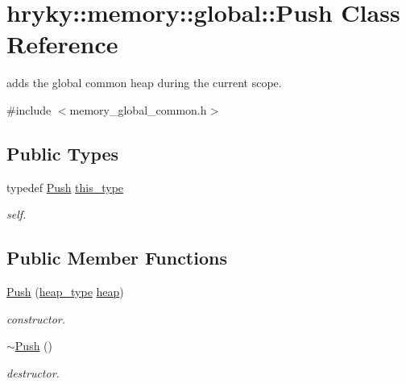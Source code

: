 \hypertarget{classhryky_1_1memory_1_1global_1_1_push}{\section{hryky\-:\-:memory\-:\-:global\-:\-:Push Class Reference}
\label{classhryky_1_1memory_1_1global_1_1_push}
}


adds the global common heap during the current scope.  




{\ttfamily \#include $<$memory\-\_\-global\-\_\-common.\-h$>$}

\subsection*{Public Types}
\begin{DoxyCompactItemize}
\item 
\hypertarget{classhryky_1_1memory_1_1global_1_1_push_a28ed03460bd7d9425c1ddc440a16dedb}{typedef \hyperlink{classhryky_1_1memory_1_1global_1_1_push}{Push} \hyperlink{classhryky_1_1memory_1_1global_1_1_push_a28ed03460bd7d9425c1ddc440a16dedb}{this\-\_\-type}}\label{classhryky_1_1memory_1_1global_1_1_push_a28ed03460bd7d9425c1ddc440a16dedb}

\begin{DoxyCompactList}\small\item\em self. \end{DoxyCompactList}\end{DoxyCompactItemize}
\subsection*{Public Member Functions}
\begin{DoxyCompactItemize}
\item 
\hyperlink{classhryky_1_1memory_1_1global_1_1_push_a073b9d557fa8584bd05f3388e08e5939}{Push} (\hyperlink{classhryky_1_1memory_1_1heap_1_1_base}{heap\-\_\-type} \hyperlink{namespacehryky_1_1memory_1_1global_a6fc6103f67c837aa0f39b359588409cd}{heap})
\begin{DoxyCompactList}\small\item\em constructor. \end{DoxyCompactList}\item 
\hyperlink{classhryky_1_1memory_1_1global_1_1_push_a6a4a096d7f3ff0414e2f73c9412b76aa}{$\sim$\-Push} ()
\begin{DoxyCompactList}\small\item\em destructor. \end{DoxyCompactList}\end{DoxyCompactItemize}



